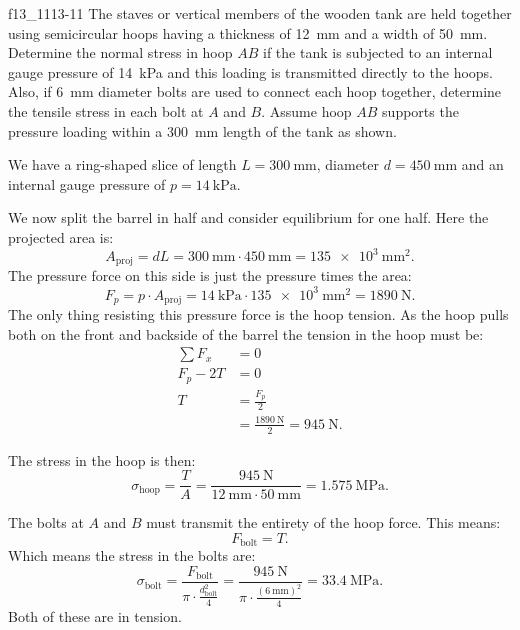 \begin{problemwithimage}{f13_11}{13-11}
  The staves or vertical members of the wooden tank are held together using semicircular hoops having a thickness of \qty{12}{\mm} and a width of \qty{50}{\mm}.
  Determine the normal stress in hoop $AB$ if the tank is subjected to an internal gauge pressure of \qty{14}{\kPa} and this loading is transmitted directly to the hoops.
  Also, if \qty{6}{\mm} diameter bolts are used to connect each hoop together, determine the tensile stress in each bolt at $A$ and $B$.
  Assume hoop $AB$ supports the pressure loading within a \qty{300}{\mm} length of the tank as shown.
\end{problemwithimage}

\begin{derivation}
  We have a ring-shaped slice of length $L = \qty{300}{\mm}$, diameter $d = \qty{450}{\mm}$ and an internal gauge pressure of $p = \qty{14}{\kPa} $.

  We now split the barrel in half and consider equilibrium for one half.
  Here the projected area is:
  \begin{equation*}
    A_{\mathrm{proj}} = d L = \qty{300}{\mm} \cdot \qty{450}{\mm} = \qty{135e3}{\mm^2} 
  .\end{equation*}
  The pressure force on this side is just the pressure times the area:
  \begin{equation*}
    F_p = p \cdot A_{\mathrm{proj}} = \qty{14}{\kPa} \cdot \qty{135e3}{\mm^2} = \qty{1890}{\N} 
  .\end{equation*}
  The only thing resisting this pressure force is the hoop tension.
  As the hoop pulls both on the front and backside of the barrel the tension in the hoop must be:
  \begin{align*}
    \sum F_x &= 0 \\
    F_p - 2 T &= 0 \\
    T &= \frac{F_p}{2} \\
      &= \frac{\qty{1890}{\N} }{2} = \qty{945}{\N}
  .\end{align*}
  
  The stress in the hoop is then:
  \begin{equation*}
    \sigma_{\mathrm{hoop}} = \frac{T}{A} = \frac{\qty{945}{\N}}{\qty{12}{\mm} \cdot \qty{50}{\mm} } = \qty{1,575}{\MPa}
  .\end{equation*}
  
  The bolts at $A$ and $B$ must transmit the entirety of the hoop force.
  This means:
  \begin{equation*}
    F_{\mathrm{bolt}} = T
  .\end{equation*}
  Which means the stress in the bolts are:
  \begin{equation*}
    \sigma_{\mathrm{bolt}} = \frac{F_{\mathrm{bolt}}}{\pi \cdot \frac{d_{\mathrm{bolt}}^2}{4}} = \frac{\qty{945}{\N} }{\pi \cdot \frac{\left( \qty{6}{\mm}  \right)^2}{4}} = \qty{33,4}{\MPa}
  .\end{equation*}
  Both of these are in tension.
\end{derivation}

